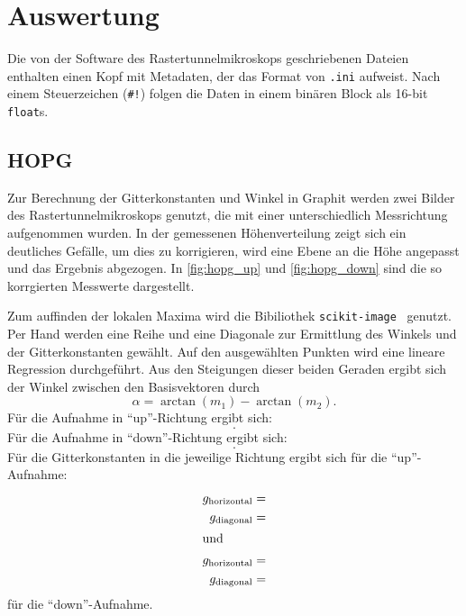 \section{Auswertung}
\label{sec:Auswertung}

Die von der Software des Rastertunnelmikroskops geschriebenen Dateien enthalten einen Kopf mit Metadaten, der das Format von \texttt{.ini} aufweist.
Nach einem Steuerzeichen (\texttt{\#!}) folgen die Daten in einem binären Block als 16-bit \texttt{float}s.

\subsection{HOPG}

Zur Berechnung der Gitterkonstanten und Winkel in Graphit werden zwei Bilder des Rastertunnelmikroskops genutzt, die mit einer unterschiedlich Messrichtung aufgenommen wurden.
In der gemessenen Höhenverteilung zeigt sich ein deutliches Gefälle, um dies zu korrigieren, wird eine Ebene an die Höhe angepasst und das Ergebnis abgezogen.
In \autoref{fig:hopg_up} und \autoref{fig:hopg_down} sind die so korrgierten Messwerte dargestellt.

Zum auffinden der lokalen Maxima wird die Bibiliothek \texttt{scikit-image}~\cite{skimage} genutzt.
Per Hand werden eine Reihe und eine Diagonale zur Ermittlung des Winkels und der Gitterkonstanten gewählt.
Auf den ausgewählten Punkten wird eine lineare Regression durchgeführt.
Aus den Steigungen dieser beiden Geraden ergibt sich der Winkel zwischen den Basisvektoren durch
\begin{equation}
  α = \arctan(m_1) -\arctan(m_2).
\end{equation}
Für die Aufnahme in \enquote{up}-Richtung ergibt sich:
\begin{equation}
  .
\end{equation}
Für die Aufnahme in \enquote{down}-Richtung ergibt sich:
\begin{equation}
  .
\end{equation}
Für die Gitterkonstanten in die jeweilige Richtung ergibt sich für die \enquote{up}-Aufnahme:
\begin{align}
  g_\text{horizontal} &=  \\
  g_\text{diagonal} &=  \\
\shortintertext{und}
  g_\text{horizontal} &=  \\
  g_\text{diagonal} &= 
\end{align}
für die \enquote{down}-Aufnahme.

